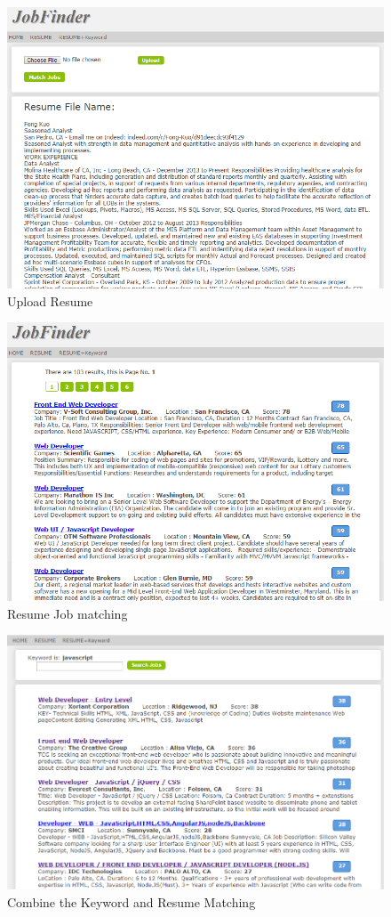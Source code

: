 \begin{figure}[htbp]
  \centering
  \includegraphics[scale=0.5]{images/upload_resume.png}
  \caption{Upload Resume}
  \label{fig:upload_resume}
\end{figure}

\begin{figure}[htbp]
  \centering
  \includegraphics[scale=0.5]{images/match_resume.png}
  \caption{Resume Job matching }
  \label{fig:match_resume}
\end{figure}

\begin{figure}[htbp]
  \centering
  \includegraphics[scale=0.5]{images/keyword_resume.png}
  \caption{Combine the Keyword and Resume Matching}
  \label{fig:keyword_resume}
\end{figure}






